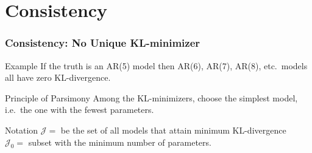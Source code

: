 \section{Consistency}
\begin{frame}
  \frametitle{Consistency: No Unique KL-minimizer}

  \begin{block}{Example}
    If the truth is an AR(5) model then AR(6), AR(7), AR(8), etc.\  models \alert{all have zero KL-divergence}. 
  \end{block}

  \pause

  \begin{block}{Principle of Parsimony}
    Among the KL-minimizers, choose the \alert{simplest model}, i.e.\ the one with the fewest parameters.
  \end{block}

  \pause

  \begin{block}{Notation}
  $\mathcal{J} = $ be the set of all models that attain minimum KL-divergence\\
  $\mathcal{J}_0= $ subset with the minimum number of parameters. 
  \end{block}
 
\end{frame}
%
% 

